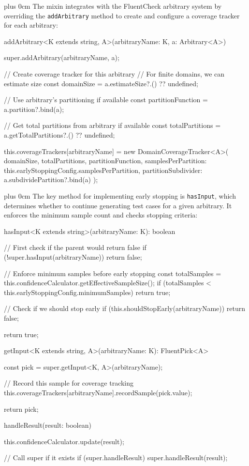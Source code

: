 \documentclass[11pt,a4paper]{article}
\newcommand{\justifytext}{\leftskip=0pt \rightskip=0pt plus 0cm}
\begin{document}
\justifytext
The mixin integrates with the FluentCheck arbitrary system by overriding the \texttt{addArbitrary} method to create and configure a coverage tracker for each arbitrary:

\begin{wrappedcode}
    addArbitrary<K extends string, A>(arbitraryName: K, a: Arbitrary<A>) {
      super.addArbitrary(arbitraryName, a);
      
      // Create coverage tracker for this arbitrary
      // For finite domains, we can estimate size
      const domainSize = a.estimateSize?.() ?? undefined;
      
      // Use arbitrary's partitioning if available
      const partitionFunction = a.partition?.bind(a);
      
      // Get total partitions from arbitrary if available
      const totalPartitions = a.getTotalPartitions?.() ?? undefined;
      
      this.coverageTrackers[arbitraryName] = new DomainCoverageTracker<A>({
        domainSize,
        totalPartitions,
        partitionFunction,
        samplesPerPartition: this.earlyStoppingConfig.samplesPerPartition,
        partitionSubdivider: a.subdividePartition?.bind(a)
      });
    }
\end{wrappedcode}

\justifytext
The key method for implementing early stopping is \texttt{hasInput}, which determines whether to continue generating test cases for a given arbitrary. It enforces the minimum sample count and checks stopping criteria:

\begin{wrappedcode}
    hasInput<K extends string>(arbitraryName: K): boolean {
      // First check if the parent would return false
      if (!super.hasInput(arbitraryName)) {
        return false;
      }
      
      // Enforce minimum samples before early stopping
      const totalSamples = this.confidenceCalculator.getEffectiveSampleSize();
      if (totalSamples < this.earlyStoppingConfig.minimumSamples) {
        return true;
      }
      
      // Check if we should stop early
      if (this.shouldStopEarly(arbitraryName)) {
        return false;
      }
      
      return true;
    }
    
    getInput<K extends string, A>(arbitraryName: K): FluentPick<A> {
      const pick = super.getInput<K, A>(arbitraryName);
      
      // Record this sample for coverage tracking
      this.coverageTrackers[arbitraryName].recordSample(pick.value);
      
      return pick;
    }
    
    handleResult(result: boolean) {
      this.confidenceCalculator.update(result);
      
      // Call super if it exists
      if (super.handleResult) {
        super.handleResult(result);
      }
    }
\end{wrappedcode}
\end{document}
